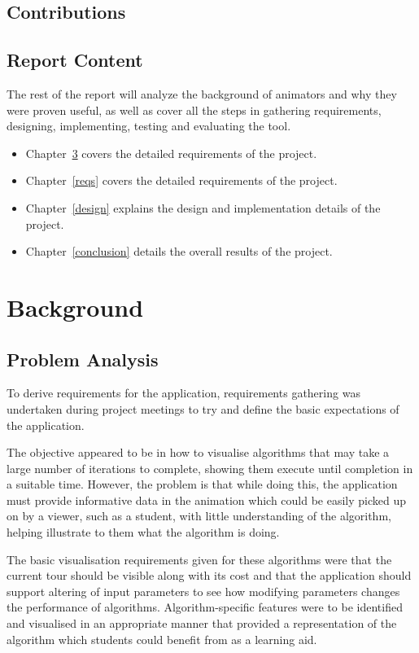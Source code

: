 \documentclass{l4proj}
\begin{document}
\section{Contributions}


\section{Report Content}
The rest of the report will analyze the background of animators and why they were proven useful, as well as cover all the steps in gathering requirements, designing, implementing, testing and evaluating the tool. 

\begin{itemize}
\item Chapter~\ref{background} covers the detailed requirements of the project.
\item Chapter~\ref{reqs} covers the detailed requirements of the project.
\item Chapter~\ref{design} explains the design and implementation details of the project.
\item Chapter~\ref{conclusion} details the overall results of the project.
\end{itemize}


\chapter{Background}
\label{background}
\section{Problem Analysis}
To derive requirements for the application, requirements gathering was undertaken during project meetings to try and define the basic 
expectations of the application.

The objective appeared to be in how to visualise algorithms that may take a large number of iterations to complete, showing them execute until 
completion in a suitable time. However, the problem is that while doing this, the application must provide informative data in the animation 
which could be easily picked up on by a viewer, such as a student, with little understanding of the algorithm, helping illustrate to them 
what the algorithm is doing.

The basic visualisation requirements given for these algorithms were that the current tour should be visible along with its cost and 
that the application should support altering of input parameters to see how modifying parameters changes the performance of algorithms. 
Algorithm-specific features were to be identified and visualised in an appropriate manner that provided a representation of the 
algorithm which students could benefit from as a learning aid.
\end{document}
